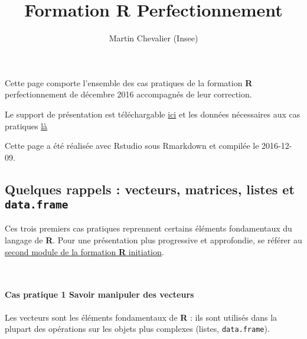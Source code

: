 \documentclass[12pt,]{article}
\title{Formation \textbf{R} Perfectionnement}
\author{Martin Chevalier (Insee)}
\date{}
\let\oldparagraph\paragraph
\renewcommand{\paragraph}[1]{\oldparagraph{#1}\mbox{}}
\begin{document}
\maketitle

Cette page comporte l'ensemble des cas pratiques de la formation
\textbf{R} perfectionnement de décembre 2016 accompagnés de leur
correction.

Le support de présentation est téléchargable
\href{presentation.pdf}{ici} et les données nécessaires aux cas
pratiques \href{donnees.zip}{là}

Cette page a été réalisée avec Rstudio sous Rmarkdown et compilée le
2016-12-09.

\subsection{\texorpdfstring{Quelques rappels : vecteurs, matrices,
listes et
\texttt{data.frame}}{Quelques rappels : vecteurs, matrices, listes et data.frame}}\label{quelques-rappels-vecteurs-matrices-listes-et-data.frame}

Ces trois premiers cas pratiques reprennent certains éléments
fondamentaux du langage de \textbf{R}. Pour une présentation plus
progressive et approfondie, se référer au
\href{http://r.slmc.fr/module2.html}{second module de la formation
\textbf{R} initiation}.

~

\paragraph{\texorpdfstring{\textbf{Cas pratique 1} Savoir manipuler des
vecteurs}{Cas pratique 1 Savoir manipuler des vecteurs}}\label{cas-pratique-1-savoir-manipuler-des-vecteurs}

Les vecteurs sont les éléments fondamentaux de \textbf{R} : ils sont
utilisés dans la plupart des opérations sur les objets plus complexes
(listes, \texttt{data.frame}).
\end{document}
